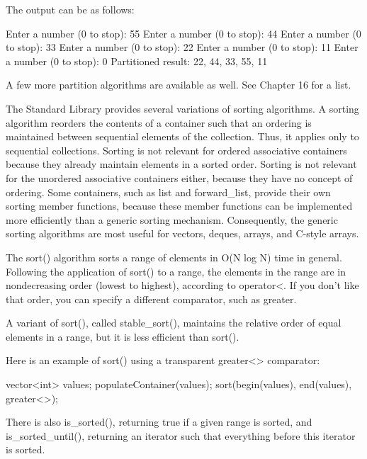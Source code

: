 The output can be as follows:

\begin{shell}
Enter a number (0 to stop): 55
Enter a number (0 to stop): 44
Enter a number (0 to stop): 33
Enter a number (0 to stop): 22
Enter a number (0 to stop): 11
Enter a number (0 to stop): 0
Partitioned result: 22, 44, 33, 55, 11
\end{shell}

A few more partition algorithms are available as well. See Chapter 16 for a list.


The Standard Library provides several variations of sorting algorithms. A sorting algorithm reorders the contents of a container such that an ordering is maintained between sequential elements of the collection. Thus, it applies only to sequential collections. Sorting is not relevant for ordered associative containers because they already maintain elements in a sorted order. Sorting is not relevant for the unordered associative containers either, because they have no concept of ordering. Some containers, such as list and forward\_list, provide their own sorting member functions, because these member functions can be implemented more efficiently than a generic sorting mechanism. Consequently, the generic sorting algorithms are most useful for vectors, deques, arrays, and C-style arrays.

The sort() algorithm sorts a range of elements in O(N log N) time in general. Following the application of sort() to a range, the elements in the range are in nondecreasing order (lowest to highest), according to operator<. If you don’t like that order, you can specify a different comparator, such as greater.

A variant of sort(), called stable\_sort(), maintains the relative order of equal elements in a range, but it is less efficient than sort().

Here is an example of sort() using a transparent greater<> comparator:

\begin{cpp}
vector<int> values;
populateContainer(values);
sort(begin(values), end(values), greater<>{});
\end{cpp}

There is also is\_sorted(), returning true if a given range is sorted, and is\_sorted\_until(), returning an iterator such that everything before this iterator is sorted.

